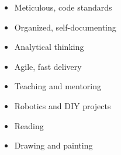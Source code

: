 %
%
%


\threecolumnsection
    {
            \begin{skills}
            \end{skills}
    }
    {
            \vspace{1em}
            \begin{itemize}
                \item Meticulous, code standards
                \item Organized, self-documenting
                \item Analytical thinking
                \item Agile, fast delivery
            \end{itemize}
    }
    {
            \vspace{1em}
            \begin{itemize}
                \item Teaching and mentoring
                \item Robotics and DIY projects
                \item Reading
                \item Drawing and painting
            \end{itemize}
    }
